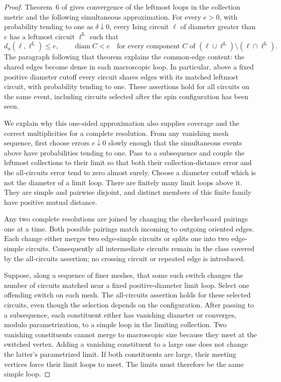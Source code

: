 \documentclass[11pt]{article}
\theoremstyle{definition}
\theoremstyle{remark}
\numberwithin{equation}{section}
\begin{document}
\begin{proof}
Theorem~6 of \cite{BH2019} gives convergence of the leftmost loops in
the collection metric and the following simultaneous approximation.
For every $e>0$, with probability tending to one as $\delta\downarrow0$,
every Ising circuit $\ell$ of diameter greater than $e$ has a leftmost
circuit $\ell^{\mathrm L}$ such that
\[
 d_{\mathrm u}(\ell,\ell^{\mathrm L})\le e,
 \qquad
 \operatorname{diam} C<e
 \quad\text{for every component }C\text{ of }
 (\ell\cup\ell^{\mathrm L})\setminus(\ell\cap\ell^{\mathrm L}).
\]
The paragraph following that theorem explains the common-edge content:
the shared edges become dense in each macroscopic loop. In particular,
above a fixed positive diameter cutoff every circuit shares edges with
its matched leftmost circuit, with probability tending to one. These
assertions hold for all circuits on the same event, including circuits
selected after the spin configuration has been seen.

We explain why this one-sided approximation also supplies coverage and
the correct multiplicities for a complete resolution. From any vanishing
mesh sequence, first choose errors $e\downarrow0$ slowly enough that the
simultaneous events above have probabilities tending to one. Pass to a
subsequence and couple the leftmost collections to their limit so that
both their collection-distance error and the all-circuits error tend to
zero almost surely. Choose a diameter
cutoff which is not the diameter of a limit loop.  There are finitely
many limit loops above it.  They are simple and pairwise disjoint, and
distinct members of this finite family have positive mutual distance.

Any two complete resolutions are joined by changing the checkerboard
pairings one at a time.  Both possible pairings match incoming to
outgoing oriented edges.  Each change either merges two edge-simple
circuits or splits one into two edge-simple circuits.  Consequently all
intermediate circuits remain in the class covered by the all-circuits
assertion; no crossing circuit or repeated edge is introduced.

Suppose, along a sequence of finer meshes, that some such switch changes
the number of circuits matched near a fixed positive-diameter limit
loop.  Select one offending switch on each mesh.  The all-circuits
assertion holds for these selected circuits, even though the selection
depends on the configuration.  After passing to a subsequence, each
constituent either has vanishing diameter or converges, modulo
parametrization, to a simple loop in the limiting collection.  Two
vanishing constituents cannot merge to macroscopic size because they
meet at the switched vertex.  Adding a vanishing constituent to a large
one does not change the latter's parametrized limit.  If both
constituents are large, their meeting vertices force their limit loops
to meet.  The limits must therefore be the same simple loop.


\end{proof}
\end{document}
